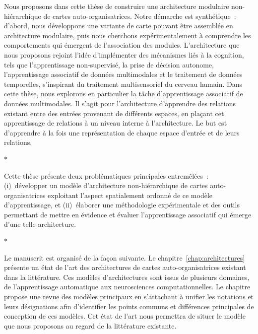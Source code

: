 Nous proposons dans cette thèse de construire une architecture modulaire non-hiérarchique de cartes auto-organisatrices.
Notre démarche est synthétique~: d'abord, nous développons une variante de carte pouvant être assemblée en architecture modulaire, puis nous cherchons expérimentalement à comprendre les comportements qui émergent de l'association des modules.
L'architecture que nous proposons rejoint l'idée d'implémenter des mécanismes liés à la cognition, tels que l'apprentissage non-supervisé, la prise de décision autonome, l'apprentissage associatif de données multimodales et le traitement de données temporelles, s'inspirant du traitement multisensoriel du cerveau humain. 
Dans cette thèse, nous explorons en particulier la tâche d'apprentissage associatif de données multimodales.
Il s'agit pour l'architecture d'apprendre des relations existant entre des entrées provenant de différents espaces, en plaçant cet apprentissage de relations à un niveau interne à l'architecture. Le but est d'apprendre à la fois une représentation de chaque espace d'entrée et de leurs relations.

\begin{center}
  $\ast$
\end{center}

Cette thèse présente deux problématiques principales entremêlées~: (i)~développer un modèle d'architecture non-hiérarchique de cartes auto-organisatrices exploitant l'aspect spatialement ordonné de ce modèle d'apprentissage, et (ii)~élaborer une méthodologie expérimentale et des outils permettant de mettre en évidence et évaluer l'apprentissage associatif qui émerge d'une telle architecture.

\begin{center}
  $\ast$
\end{center}

Le manuscrit est organisé de la façon suivante.
Le chapitre~\ref{chap:architectures} présente un état de l'art des architectures de cartes auto-organisatrices existant dans la littérature. Ces modèles d'architectures sont issus de plusieurs domaines, de l'apprentissage automatique aux neurosciences computationnelles.
Le chapitre propose une revue des modèles principaux en s'attachant à unifier les notations et leurs désignations afin d'identifier les points communs et différences principales de conception de ces modèles.
Cet état de l'art nous permettra de situer le modèle que nous proposons au regard de la littérature existante.

